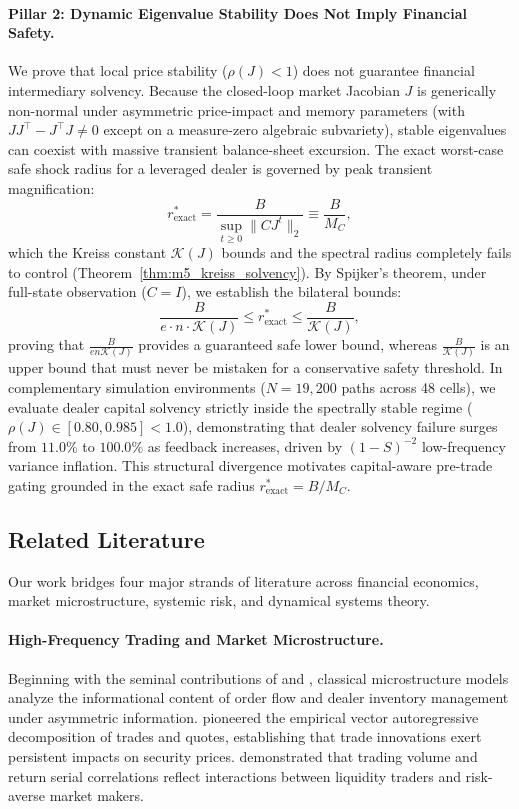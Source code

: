 \documentclass[12pt]{article}
\theoremstyle{definition}
\theoremstyle{remark}
\begin{document}
\paragraph{Pillar 2: Dynamic Eigenvalue Stability Does Not Imply Financial Safety.}
We prove that local price stability ($\rho(J) < 1$) does not guarantee financial intermediary solvency. Because the closed-loop market Jacobian $J$ is generically non-normal under asymmetric price-impact and memory parameters (with $J J^\top - J^\top J \neq 0$ except on a measure-zero algebraic subvariety), stable eigenvalues can coexist with massive transient balance-sheet excursion. The exact worst-case safe shock radius for a leveraged dealer is governed by peak transient magnification:
\begin{equation}
r^*_{\text{exact}} = \frac{B}{\sup_{t \ge 0} \|C J^t\|_2} \equiv \frac{B}{M_C},
\end{equation}
which the Kreiss constant $\mathcal{K}(J)$ bounds and the spectral radius completely fails to control (Theorem~\ref{thm:m5_kreiss_solvency}). By Spijker's theorem, under full-state observation ($C = I$), we establish the bilateral bounds:
\begin{equation}
\frac{B}{e \cdot n \cdot \mathcal{K}(J)} \le r^*_{\text{exact}} \le \frac{B}{\mathcal{K}(J)},
\end{equation}
proving that $\frac{B}{e n \mathcal{K}(J)}$ provides a guaranteed safe lower bound, whereas $\frac{B}{\mathcal{K}(J)}$ is an upper bound that must never be mistaken for a conservative safety threshold. In complementary simulation environments ($N = 19{,}200$ paths across 48 cells), we evaluate dealer capital solvency strictly inside the spectrally stable regime ($\rho(J) \in [0.80, 0.985] < 1.0$), demonstrating that dealer solvency failure surges from $11.0\%$ to $100.0\%$ as feedback increases, driven by $(1 - S)^{-2}$ low-frequency variance inflation. This structural divergence motivates capital-aware pre-trade gating grounded in the exact safe radius $r^*_{\text{exact}} = B/M_C$.

\subsection{Related Literature}
Our work bridges four major strands of literature across financial economics, market microstructure, systemic risk, and dynamical systems theory.

\paragraph{High-Frequency Trading and Market Microstructure.}
Beginning with the seminal contributions of \citet{kyle1985continuous} and \citet{glosten1985bid}, classical microstructure models analyze the informational content of order flow and dealer inventory management under asymmetric information. \citet{hasbrouck1991} pioneered the empirical vector autoregressive decomposition of trades and quotes, establishing that trade innovations exert persistent impacts on security prices. \citet{campbell1993trading} demonstrated that trading volume and return serial correlations reflect interactions between liquidity traders and risk-averse market makers.
\end{document}
